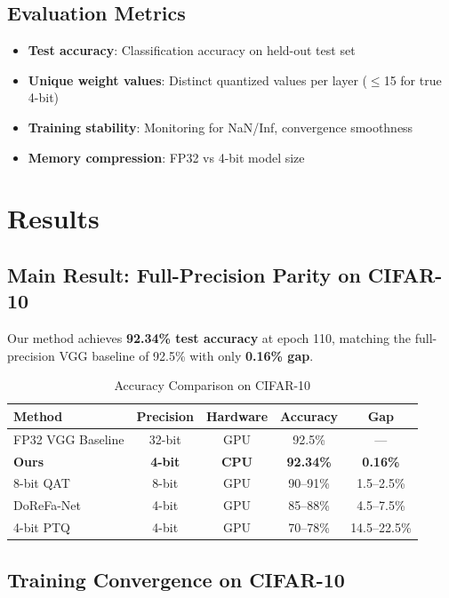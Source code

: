 \documentclass[conference]{IEEEtran}
\begin{document}
\subsection{Evaluation Metrics}
\begin{itemize}
    \item \textbf{Test accuracy}: Classification accuracy on held-out test set
    \item \textbf{Unique weight values}: Distinct quantized values per layer ($\leq$15 for true 4-bit)
    \item \textbf{Training stability}: Monitoring for NaN/Inf, convergence smoothness
    \item \textbf{Memory compression}: FP32 vs 4-bit model size
\end{itemize}

\section{Results}

\subsection{Main Result: Full-Precision Parity on CIFAR-10}
Our method achieves \textbf{92.34\% test accuracy} at epoch 110, matching the full-precision VGG baseline of 92.5\% with only \textbf{0.16\% gap}.

\begin{table}[h]
\centering
\caption{Accuracy Comparison on CIFAR-10}
\label{tab:accuracy}
\begin{tabular}{@{}lcccc@{}}
\toprule
\textbf{Method} & \textbf{Precision} & \textbf{Hardware} & \textbf{Accuracy} & \textbf{Gap} \\
\midrule
FP32 VGG Baseline & 32-bit & GPU & 92.5\% & --- \\
\midrule
\textbf{Ours} & \textbf{4-bit} & \textbf{CPU} & \textbf{92.34\%} & \textbf{0.16\%} \\
8-bit QAT & 8-bit & GPU & 90--91\% & 1.5--2.5\% \\
DoReFa-Net & 4-bit & GPU & 85--88\% & 4.5--7.5\% \\
4-bit PTQ & 4-bit & GPU & 70--78\% & 14.5--22.5\% \\
\bottomrule
\end{tabular}
\end{table}

\subsection{Training Convergence on CIFAR-10}
\end{document}
